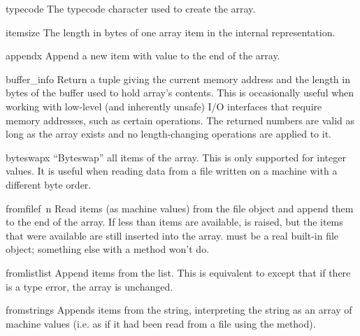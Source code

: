 \begin{datadesc}{typecode}
The typecode character used to create the array.
\end{datadesc}

\begin{datadesc}{itemsize}
The length in bytes of one array item in the internal representation.
\end{datadesc}


\begin{funcdesc}{append}{x}
Append a new item with value  to the end of the array.
\end{funcdesc}

\begin{funcdesc}{buffer_info}{}
Return a tuple  giving the current
memory address and the length in bytes of the buffer used to hold
array's contents.  This is occasionally useful when working with
low-level (and inherently unsafe) I/O interfaces that require memory
addresses, such as certain  operations.  The returned
numbers are valid as long as the array exists and no length-changing
operations are applied to it.
\end{funcdesc}

\begin{funcdesc}{byteswap}{x}
``Byteswap'' all items of the array.  This is only supported for
integer values.  It is useful when reading data from a file written
on a machine with a different byte order.
\end{funcdesc}

\begin{funcdesc}{fromfile}{f\, n}
Read  items (as machine values) from the file object 
and append them to the end of the array.  If less than  items
are available,  is raised, but the items that were
available are still inserted into the array.   must be a real
built-in file object; something else with a  method won't
do.
\end{funcdesc}

\begin{funcdesc}{fromlist}{list}
Append items from the list.  This is equivalent to
except that if there is a type error, the array is unchanged.
\end{funcdesc}

\begin{funcdesc}{fromstring}{s}
Appends items from the string, interpreting the string as an
array of machine values (i.e. as if it had been read from a
file using the  method).
\end{funcdesc}

